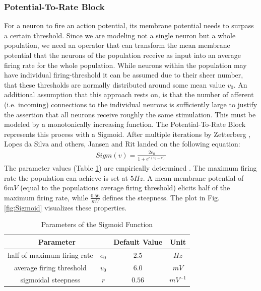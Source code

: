 \subsubsection{Potential-To-Rate Block}
For a neuron to fire an action potential, its membrane potential needs to surpass a certain threshold.
Since we are modeling not a single neuron but a whole population, we need an operator that can transform
the mean membrane potential that the neurons of the population receive as input into an average firing rate
for the whole population.
While neurons within the population may have individual firing-threshold%
it can be assumed due to their sheer number, that these thresholds are normally distributed around some mean value $v_0$. %
An additional assumption that this approach rests on, is that the number of afferent (i.e. incoming) connections to the individual neurons is sufficiently large to justify the assertion that all neurons receive roughly the same stimulation.
This must be modeled by a monotonically increasing function.
The Potential-To-Rate Block represents this process with a Sigmoid.
After multiple iterations by Zetterberg \cite{zetterberg_performance_1978}, Lopes da Silva \cite{lopes_da_silva_models_1976} and others, Jansen and Rit \cite{jansen_neurophysiologically-based_1993, jansen_electroencephalogram_1995} landed on the following equation:
\begin{align}
    Sigm(v) = \frac{2e_0}{1+e^{r(v_0-v)}} \label{eq:SigmJansenRit}
\end{align}
The parameter values (Table \ref{table:sigmoid_params}) are empirically determined \parencite{jansen_neurophysiologically-based_1993}. The maximum firing rate the population can achieve is set at $5 Hz$. A mean membrane potential of $6 mV$ (equal to the populations average firing threshold) elicits half of the maximum firing rate, while $\frac{0.56}{mV}$ defines the steepness. The plot in Fig. \ref{fig:Sigmoid} visualizes these properties.
\begin{table}[H]
    \centering
    \begin{tabular}{ |c|c|c|c| }
        \hline
        \multicolumn{2}{|c|}{Parameter} & Default Value & Unit \\
        \hline
        \hline
        half of maximum firing rate & \(e_0\) & \(2.5\)  & \(Hz\)      \\
        \hline
        average firing threshold    & \(v_0\) & \(6.0\)  & \(mV\)      \\
        \hline
        sigmoidal steepness         & \(r\)   & \(0.56\) & \(mV^{-1}\) \\
        \hline
    \end{tabular}
    \caption{Parameters of the Sigmoid Function}
    \label{table:sigmoid_params}
\end{table}

